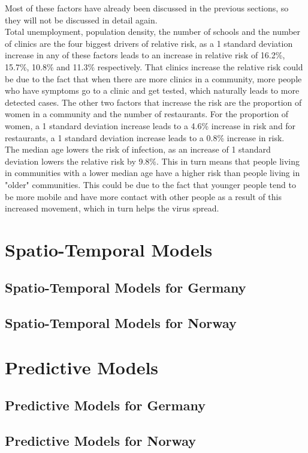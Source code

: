Most of these factors have already been discussed in the previous sections, so they will not be discussed in detail again. \\
Total unemployment, population density, the number of schools and the number of clinics are the four biggest drivers of relative risk, as a 1 standard deviation increase in any of these factors leads to an increase in relative risk of 16.2\%, 15.7\%, 10.8\% and 11.3\% respectively. That clinics increase the relative risk could be due to the fact that when there are more clinics in a community, more people who have symptoms go to a clinic and get tested, which naturally leads to more detected cases. The other two factors that increase the risk are the proportion of women in a community and the number of restaurants. For the proportion of women, a 1 standard deviation increase leads to a 4.6\% increase in risk and for restaurants, a 1 standard deviation increase leads to a 0.8\% increase in risk. \\
The median age lowers the risk of infection, as an increase of 1 standard deviation lowers the relative risk by 9.8\%. This in turn means that people living in communities with a lower median age have a higher risk than people living in "older" communities. This could be due to the fact that younger people tend to be more mobile and have more contact with other people as a result of this increased movement, which in turn helps the virus spread.
\clearpage
\section{Spatio-Temporal Models}
\subsection{Spatio-Temporal Models for Germany}
\subsection{Spatio-Temporal Models for Norway}
\section{Predictive Models}
\clearpage
\subsection{Predictive Models for Germany}
\subsection{Predictive Models for Norway}